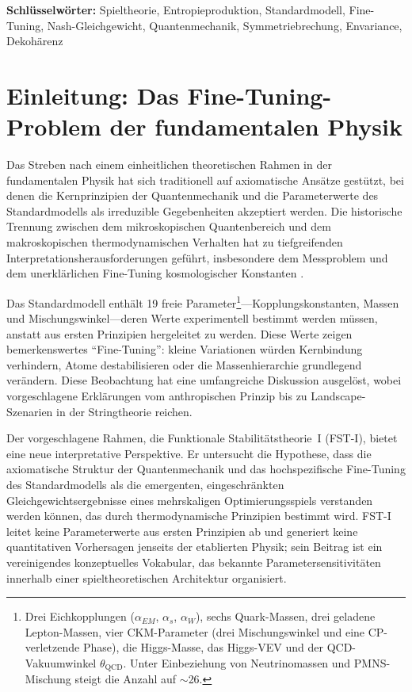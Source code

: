 \documentclass[12pt,a4paper]{article}
\theoremstyle{remark}
\begin{document}
\textbf{Schl\"usselw\"orter:} Spieltheorie, Entropieproduktion, Standardmodell, Fine-Tuning, Nash-Gleichgewicht, Quantenmechanik, Symmetriebrechung, Envariance, Dekoh\"arenz

\clearpage

\section{Einleitung: Das Fine-Tuning-Problem der fundamentalen Physik}
\label{sec:introduction}

Das Streben nach einem einheitlichen theoretischen Rahmen in der fundamentalen Physik hat sich traditionell auf axiomatische Ans\"atze gest\"utzt, bei denen die Kernprinzipien der Quantenmechanik und die Parameterwerte des Standardmodells als irreduzible Gegebenheiten akzeptiert werden. Die historische Trennung zwischen dem mikroskopischen Quantenbereich und dem makroskopischen thermodynamischen Verhalten hat zu tiefgreifenden Interpretationsherausforderungen gef\"uhrt, insbesondere dem Messproblem und dem unerkl\"arlichen Fine-Tuning kosmologischer Konstanten \citep{Adams2019}.

Das Standardmodell enth\"alt 19 freie Parameter\footnote{Drei Eichkopplungen ($\alpha_{EM}$, $\alpha_s$, $\alpha_W$), sechs Quark-Massen, drei geladene Lepton-Massen, vier CKM-Parameter (drei Mischungswinkel und eine CP-verletzende Phase), die Higgs-Masse, das Higgs-VEV und der QCD-Vakuumwinkel $\theta_{\text{QCD}}$. Unter Einbeziehung von Neutrinomassen und PMNS-Mischung steigt die Anzahl auf $\sim$26.}---Kopplungskonstanten, Massen und Mischungswinkel---deren Werte experimentell bestimmt werden m\"ussen, anstatt aus ersten Prinzipien hergeleitet zu werden. Diese Werte zeigen bemerkenswertes ``Fine-Tuning'': kleine Variationen w\"urden Kernbindung verhindern, Atome destabilisieren oder die Massenhierarchie grundlegend ver\"andern. Diese Beobachtung hat eine umfangreiche Diskussion ausgel\"ost, wobei vorgeschlagene Erkl\"arungen vom anthropischen Prinzip \citep{Weinberg1987,Susskind2005} bis zu Landscape-Szenarien in der Stringtheorie \citep{Bousso2000} reichen.

Der vorgeschlagene Rahmen, die Funktionale Stabilit\"atstheorie~I (FST-I), bietet eine neue interpretative Perspektive. Er untersucht die Hypothese, dass die axiomatische Struktur der Quantenmechanik und das hochspezifische Fine-Tuning des Standardmodells als die emergenten, eingeschr\"ankten Gleichgewichtsergebnisse eines mehrskaligen Optimierungsspiels verstanden werden k\"onnen, das durch thermodynamische Prinzipien bestimmt wird. FST-I leitet keine Parameterwerte aus ersten Prinzipien ab und generiert keine quantitativen Vorhersagen jenseits der etablierten Physik; sein Beitrag ist ein vereinigendes konzeptuelles Vokabular, das bekannte Parametersensitivit\"aten innerhalb einer spieltheoretischen Architektur organisiert.
\end{document}
